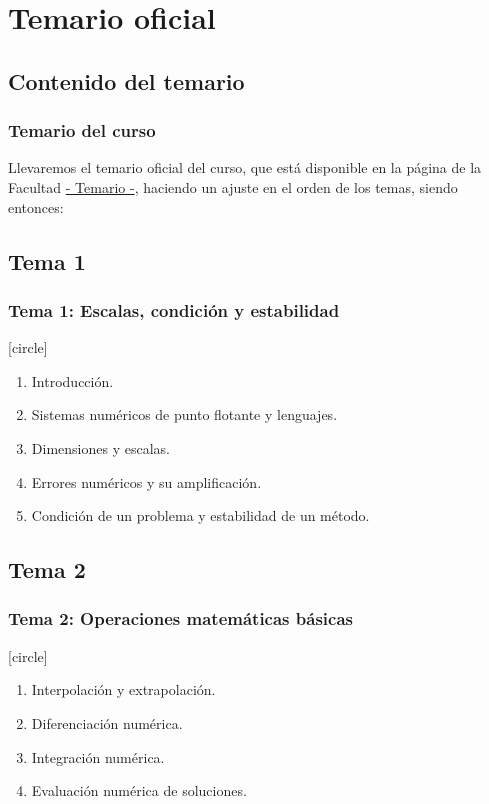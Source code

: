 \documentclass[12pt]{beamer}
\begin{document}
\section{Temario oficial}
\subsection{Contenido del temario}
\begin{frame}
\frametitle{Temario del curso}
Llevaremos el temario oficial del curso, que está disponible en la página de la Facultad \href{http://www.fciencias.unam.mx/asignaturas/715.pdf}{- Temario -}, haciendo un ajuste en el orden de los temas, siendo entonces:
\end{frame}
\subsection*{Tema 1}
\begin{frame}
\frametitle{\textbf{Tema 1: Escalas, condición y estabilidad}}
[circle]
\begin{enumerate}[<+->]
\item Introducción.
\item Sistemas numéricos de punto flotante y lenguajes.
\item Dimensiones y escalas.
\item Errores numéricos y su amplificación.
\item Condición de un problema y estabilidad de un método.
\end{enumerate}
\end{frame}
\subsection*{Tema 2}
\begin{frame}
\frametitle{\textbf{Tema 2: Operaciones matemáticas básicas}}
[circle]
\begin{enumerate}[<+->]
\item Interpolación y extrapolación.
\item Diferenciación numérica.
\item Integración numérica.
\item Evaluación numérica de soluciones.
\end{enumerate}
\end{frame}
\end{document}
